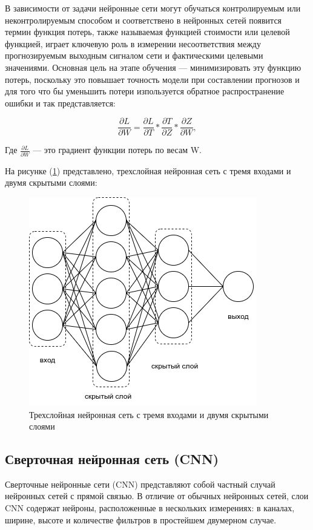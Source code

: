 В зависимости от задачи нейронные сети могут обучаться контролируемым или неконтролируемым способом и соответствено в нейронных сетей появится термин функция потерь, также называемая функцией стоимости или целевой функцией, играет ключевую роль в измерении несоответствия между прогнозируемым выходным сигналом сети и фактическими целевыми значениями. Основная цель на этапе обучения — минимизировать эту функцию потерь, поскольку это повышает точность модели при составлении прогнозов и для того что бы уменьшить потери изпользуется обратное распространение ошибки и так представляется:

\begin{equation}
    \frac{\partial L}{\partial W} = \frac{\partial L}{\partial T} * \frac{\partial T}{\partial Z} * \frac{\partial Z}{\partial W}
, \end{equation}

Где \(\frac{\partial L}{\partial W}\) — это градиент функции потерь по весам W.

На рисунке (\ref{fig:neuron-arch}) представлено, трехслойная нейронная сеть с тремя входами и двумя скрытыми слоями: 
\begin{figure}[H]
	\centering
	\includegraphics[width=0.5\linewidth]{assets/neural-arch.png}
	\caption{Трехслойная нейронная сеть с тремя входами и двумя скрытыми слоями}
	\label{fig:neuron-arch}
\end{figure}

\subsection{Сверточная нейронная сеть (CNN)}

Сверточные нейронные сети (CNN) представляют собой частный случай нейронных сетей с прямой связью. В отличие от обычных нейронных сетей, слои CNN содержат нейроны, расположенные в нескольких измерениях: в каналах, ширине, высоте и количестве фильтров в простейшем двумерном случае.

